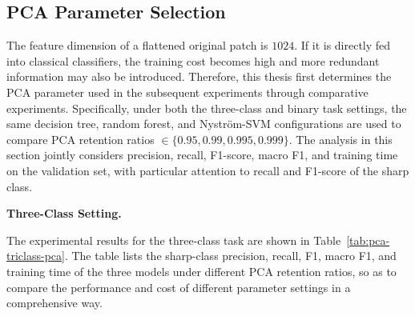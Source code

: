 \subsection{PCA Parameter Selection}
\par The feature dimension of a flattened original patch is $1024$. If it is
directly fed into classical classifiers, the training cost becomes high and
more redundant information may also be introduced. Therefore, this thesis first
determines the PCA parameter used in the subsequent experiments through
comparative experiments. Specifically, under both the three-class and binary
task settings, the same decision tree, random forest, and Nystr\"{o}m-SVM
configurations are used to compare PCA retention ratios
\(\in\{0.95,0.99,0.995,0.999\}\). The analysis in this section jointly
considers precision, recall, F1-score, macro F1, and training time on the
validation set, with particular attention to recall and F1-score of the sharp
class.

\par\medskip \noindent\textbf{Three-Class Setting.} \par The experimental
results for the three-class task are shown in
Table~\ref{tab:pca-triclass-pca}. The table lists the sharp-class precision,
recall, F1, macro F1, and training time of the three models under different
PCA retention ratios, so as to compare the performance and cost of different
parameter settings in a comprehensive way.

